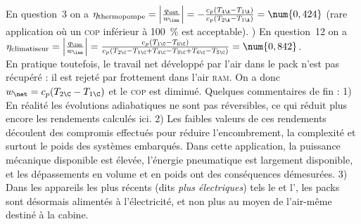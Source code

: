 \begin{description}
			En question~3 on a $\eta_\text{thermopompe} 
			= \left|\frac{q_\out}{w_\inn}\right| 
			= -\frac{c_p (T_{4\A} - T_{1\A})}{c_p (T_{2\A}-T_{1\A})} 
			= \num{0,424}$ (rare application où un \textsc{cop} inférieur à \SI{100}{\percent} est acceptable).
			) En question~12 on a $\eta_\text{climatiseur} = \left|\frac{q_\inn}{w_\inn}\right| = \frac{c_p(T_{1\C} - T_{6\C})}{c_p (T_{2\C} - T_{1\C} + T_{4\C} - T_{3\C} + T_{6\C} - T_{5\C})} = \num{0,842} $.\\
			En pratique toutefois, le travail net développé par l’air dans le pack n’est pas récupéré : il est rejeté par frottement dans l’air \textsc{ram}. On a donc $w_\net = c_p(T_{2\C} - T_{1\C})$ et le \textsc{cop} est diminué.
			\tab Quelques commentaires de fin : 1) En réalité les évolutions adiabatiques ne sont pas réversibles, ce qui réduit plus encore les rendements calculés ici. 2) Les faibles valeurs de ces rendements découlent des compromis effectués pour réduire l’encombrement, la complexité et surtout le poids des systèmes embarqués. Dans cette application, la puissance mécanique disponible est élevée, l’énergie pneumatique est largement disponible, et les dépassements en volume et en poids ont des conséquences démesurées. 3) Dans les appareils les plus récents (dits \textit{plus électriques}) tels le  et l’, les packs sont désormais alimentés à l’électricité, et non plus au moyen de l’air-même destiné à la cabine.
\end{description}
